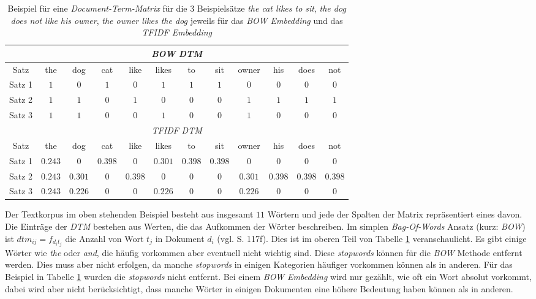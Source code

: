 \documentclass[a4paper,11pt]{article}
\begin{document}
\begin{table}[ht]
\begin{center}
    

\begin{tabular}{|c||ccccccccccc|}
\hline
\multicolumn{12}{|c|}{\textit{BOW} \textit{DTM}} \\
\hline 
   Satz   & the & dog & cat & like & likes &  to & sit  & owner & his &  does & not \\
      \hline
Satz 1 & $1$ & $0$ & $1$ & $0$ & $1$ & $1$ & $1$ & $0$ & $0$ &  $0$ & $0$ \\
Satz 2 & $1$ & $1$ & $0$ & $1$ & $0$ & $0$ & $0$ & $1$ & $1$ &  $1$ & $1$ \\
Satz 3 & $1$ & $1$ & $0$ & $0$ & $1$ & $0$ & $0$ & $1$ & $0$ &  $0$ & $0$ \\

\hline

\multicolumn{12}{|c|}{\textit{TFIDF} \textit{DTM}} \\
\hline 
   Satz   & the & dog & cat & like & likes &  to & sit  & owner & his &  does & not \\
      \hline
Satz 1 & $0.243$ & $0$ & $0.398$ & $0$ & $0.301$ & $0.398$ & $0.398$ & $0$ & $0$ &  $0$ & $0$ \\
Satz 2 & $0.243$ & $0.301$ & $0$ & $0.398$ & $0$ & $0$ & $0$ & $0.301$ & $0.398$ &  $0.398$ & $0.398$ \\
Satz 3 & $0.243$ & $0.226$ & $0$ & $0$ & $0.226$ & $0$ & $0$ & $0.226$ & $0$ & $0$ & $0$ \\
\hline
\end{tabular}
\end{center}{}
\caption{Beispiel für eine \textit{Document-Term-Matrix} für die $3$ Beispielsätze \textit{the cat likes to sit}, \textit{the dog does not like his owner}, \textit{the owner likes the dog} jeweils für das \textit{BOW Embedding} und das \textit{TFIDF Embedding} }  
\label{tab:BOWExample}

\end{table}

Der Textkorpus im oben stehenden Beispiel besteht aus insgesamt $11$ Wörtern und jede der Spalten der Matrix repräsentiert eines davon.
Die Einträge der \textit{DTM} bestehen aus Werten, die das Aufkommen der Wörter beschreiben. Im simplen \textit{Bag-Of-Words} Ansatz (kurz: \textit{BOW}) ist $dtm_{ij} = f_{d_i t_j}$ die Anzahl von Wort $t_j$ in Dokument $d_i$ (vgl. \cite{deepEssentials} S. 117f). Dies ist im oberen Teil von Tabelle \ref{tab:BOWExample} veranschaulicht. Es gibt einige Wörter wie \textit{the} oder \textit{and}, die häufig vorkommen aber eventuell nicht wichtig sind. Diese \textit{stopwords} können für die \textit{BOW} Methode entfernt werden. Dies muss aber nicht erfolgen, da manche \textit{stopwords} in einigen Kategorien häufiger vorkommen können als in anderen. Für das Beispiel in Tabelle \ref{tab:BOWExample} wurden die \textit{stopwords} nicht entfernt.
Bei einem \textit{BOW Embedding} wird nur gezählt, wie oft ein Wort absolut vorkommt, dabei wird aber nicht berücksichtigt, dass manche Wörter in einigen Dokumenten eine höhere Bedeutung haben können als in anderen. \\
\end{document}
